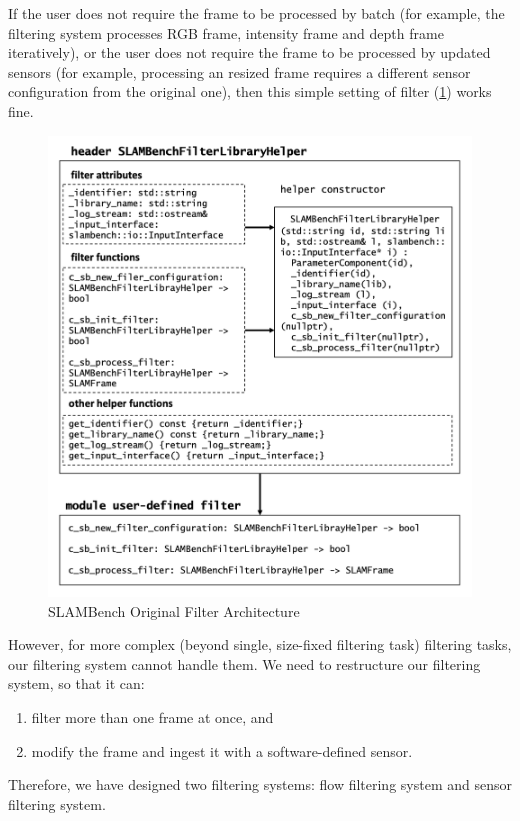 If the user does not require the frame to be processed by batch (for example, the filtering system processes RGB frame, intensity frame and depth frame iteratively), or the user does not require the frame to be processed by updated sensors (for example, processing an resized frame requires a different sensor configuration from the original one), then this simple setting of filter (\ref{fig:filterarc}) works fine.

\begin{figure}[!htbp]
	\caption{\label{fig:filterarc}SLAMBench Original Filter Architecture}
	\includegraphics[width=14cm]{figures/filter-architecture.png}
	\centering
\end{figure}

However, for more complex (beyond single, size-fixed filtering task) filtering tasks, our filtering system cannot handle them. 
We need to restructure our filtering system, so that it can: 
\begin{enumerate}
	\item filter more than one frame at once, and
	\item modify the frame and ingest it with a software-defined sensor.
\end{enumerate}
Therefore, we have designed two filtering systems: flow filtering system and sensor filtering system.

